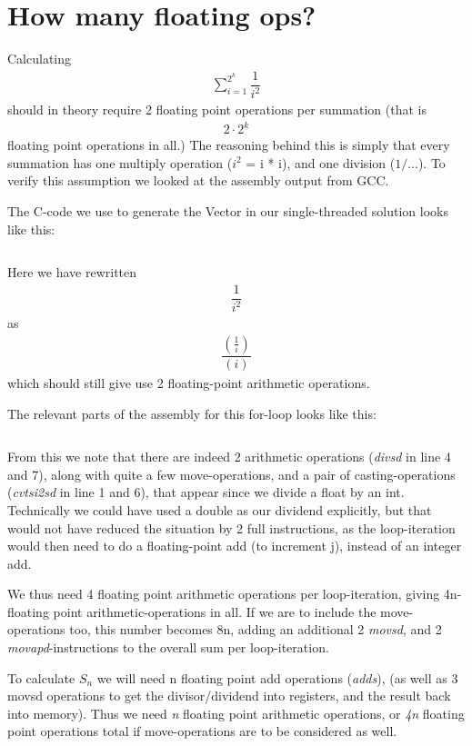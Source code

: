 \section{How many floating ops?}

Calculating \begin{align*}\sum_{i=1}^{2^k}\dfrac{1}{i^2}\end{align*} should in theory require 2 floating
point operations per summation (that is 
\begin{align*}2\cdot 2^k
\end{align*} 
floating point operations in all.)
The reasoning behind this is simply that every summation has one multiply operation ($i^2$ = i * i), and one division
($1/...$). To verify this assumption we looked at the assembly output from GCC.

The C-code we use to generate the Vector in our single-threaded solution
looks like this:
\inputminted[tabsize=4]{c}{CreateVector.c}

Here we have rewritten 
\begin{align*}
\dfrac{1}{i^2}
\end{align*} 
as 
\begin{align*}
\dfrac{\left(\frac{1}{i}\right)}{(i)}
\end{align*}
which
should still give use 2 floating-point arithmetic operations.

The relevant parts of the assembly for this for-loop looks like this:

\inputminted[linenos]{gas}{SingleThread.s}

From this we note that there are indeed 2 arithmetic operations (\textit{divsd} in line 4 and 7), along with quite a few move-operations,
and a pair of casting-operations (\textit{cvtsi2sd} in line 1 and 6), that appear since we divide a float by an int. Technically we could
have used a double as our dividend explicitly, but that would not have reduced the situation by 2 full instructions,
as the loop-iteration would then need to do a floating-point add (to increment j), instead of an integer add.

We thus need 4 floating point arithmetic operations per loop-iteration, giving 4n-floating point arithmetic-operations in all. If we are to include the move-operations too, this number becomes 8n, adding an additional 2 \textit{movsd},
and 2 \textit{movapd}-instructions to the overall sum per loop-iteration.

To calculate $S_n$ we will need n floating point add operations (\textit{adds}), (as well as 3 movsd operations to get the divisor/dividend
into registers, and the result back into memory). Thus we need \textit{n} floating point arithmetic operations, or \textit{4n} floating point
operations total if move-operations are to be considered as well.

